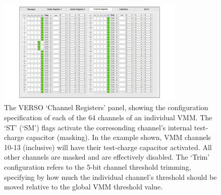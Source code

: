 \begin{figure}[!htb]
    \begin{center}
        \includegraphics[width=0.8\textwidth]{figures/nsw/vrs/verso_chanreg}
        \caption{
            The VERSO `Channel Registers' panel, showing the configuration specification
            of each of the 64 channels of an individual VMM.
            The `ST' (`SM') flags activate the corresonding channel's internal test-charge
            capacitor (masking).
            In the example shown, VMM channels 10-13 (inclusive) will have their
            test-charge capacitor activated. All other channels are masked and
            are effectively disabled.
            The `Trim' configuration refers to the 5-bit channel threshold trimming,
            specifying by how much the individual channel's threshold should be moved
            relative to the global VMM threshold value.
        }
        \label{fig:verso_chanreg}
    \end{center}
\end{figure}

\FloatBarrier
